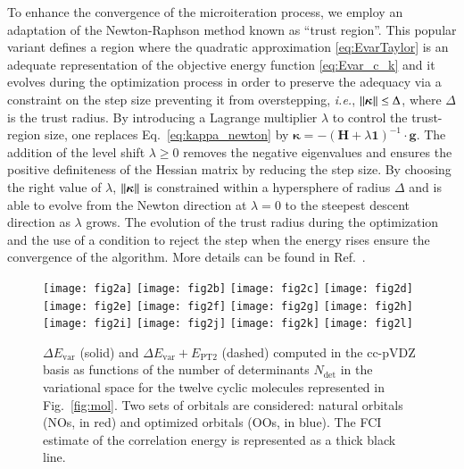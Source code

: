 \documentclass[aip,jcp,reprint,noshowkeys,superscriptaddress,floatfix]{revtex4-1}
\newcommand{\ie}{\textit{i.e.}}
\newcommand{\Ndet}{N_\text{det}}
\newcommand{\bI}{\boldsymbol{1}}
\newcommand{\bH}{\boldsymbol{H}}
\newcommand{\bg}{\boldsymbol{g}}
\newcommand{\bk}{\boldsymbol{\kappa}}
\newcommand{\Evar}{E_\text{var}}
\newcommand{\EPT}{E_\text{PT2}}
\begin{document}
To enhance the convergence of the microiteration process, we employ an adaptation of the Newton-Raphson method known as ``trust region''. \cite{Nocedal_1999}
This popular variant defines a region where the quadratic approximation \eqref{eq:EvarTaylor} is an adequate representation of the objective energy function \eqref{eq:Evar_c_k} and it evolves during the optimization process in order to preserve the adequacy via a constraint on the step size preventing it from overstepping, \ie, $\norm{\bk} \leq \Delta$, where $\Delta$ is the trust radius.
By introducing a Lagrange multiplier $\lambda$ to control the trust-region size, one replaces Eq.~\eqref{eq:kappa_newton} by $\bk = - (\bH + \lambda \bI)^{-1} \cdot \bg$.
The addition of the level shift $\lambda \geq 0$ removes the negative eigenvalues and ensures the positive definiteness of the Hessian matrix by reducing the step size.
By choosing the right value of $\lambda$, $\norm{\bk}$ is constrained within a hypersphere of radius $\Delta$ and is able to evolve from the Newton direction at $\lambda = 0$ to the steepest descent direction as $\lambda$ grows.
The evolution of the trust radius during the optimization and the use of a condition to reject the step when the energy rises ensure the convergence of the algorithm.
More details can be found in Ref.~.

\begin{figure*}
	\texttt{[image: fig2a]}
	\texttt{[image: fig2b]}
	\texttt{[image: fig2c]}
	\texttt{[image: fig2d]}
	\\
	\texttt{[image: fig2e]}
	\texttt{[image: fig2f]}
	\texttt{[image: fig2g]}
	\texttt{[image: fig2h]}
	\\
	\texttt{[image: fig2i]}
	\texttt{[image: fig2j]}
	\texttt{[image: fig2k]}
	\texttt{[image: fig2l]}
	\caption{$\Delta \Evar$ (solid) and $\Delta \Evar + \EPT$ (dashed) computed in the cc-pVDZ basis as functions of the number of determinants $\Ndet$ in the variational space for the twelve cyclic molecules represented in Fig.~\ref{fig:mol}.
	Two sets of orbitals are considered: natural orbitals (NOs, in red) and optimized orbitals (OOs, in blue).
	The FCI estimate of the correlation energy is represented as a thick black line.
	\label{fig:vsNdet}
	}
\end{figure*}
\end{document}
